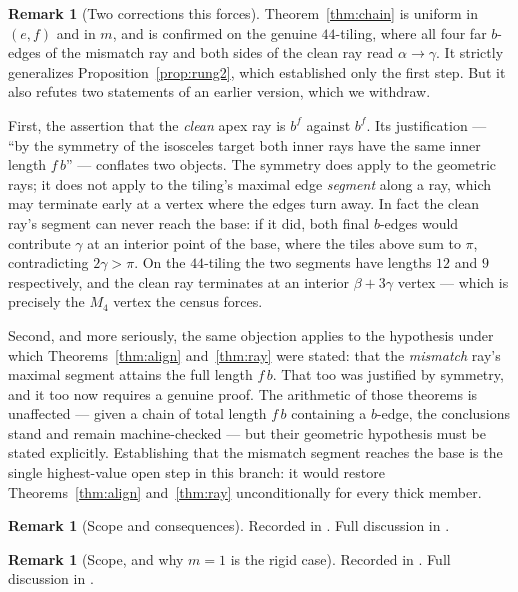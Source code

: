 \documentclass[11pt,reqno]{amsart}
\theoremstyle{plain}
\theoremstyle{definition}
\newtheorem{remark}[theorem]{Remark}
\begin{document}
\begin{remark}[Two corrections this forces]\label{rem:cleanfail}
Theorem~\ref{thm:chain} is uniform in $(e,f)$ and in $m$, and is confirmed on the genuine
$44$-tiling, where all four far $b$-edges of the mismatch ray and both sides of the clean ray read
$\alpha\to\gamma$. It strictly generalizes Proposition~\ref{prop:rung2}, which established only the
first step. But it also refutes two statements of an earlier version, which we withdraw.

First, the assertion that the \emph{clean} apex ray is $b^{f}$ against $b^{f}$. Its justification ---
``by the symmetry of the isosceles target both inner rays have the same inner length $f\,b$'' ---
conflates two objects. The symmetry does apply to the geometric rays; it does not apply to the
tiling's maximal edge \emph{segment} along a ray, which may terminate early at a vertex where the
edges turn away. In fact the clean ray's segment can never reach the base: if it did, both final
$b$-edges would contribute $\gamma$ at an interior point of the base, where the tiles above sum to
$\pi$, contradicting $2\gamma>\pi$. On the $44$-tiling the two segments have lengths $12$ and $9$
respectively, and the clean ray terminates at an interior $\beta+3\gamma$ vertex --- which is
precisely the $M_4$ vertex the census forces.

Second, and more seriously, the same objection applies to the hypothesis under which
Theorems~\ref{thm:align} and~\ref{thm:ray} were stated: that the \emph{mismatch} ray's maximal
segment attains the full length $f\,b$. That too was justified by symmetry, and it too now requires a
genuine proof. The arithmetic of those theorems is unaffected --- given a chain of total length
$f\,b$ containing a $b$-edge, the conclusions stand and remain machine-checked --- but their
geometric hypothesis must be stated explicitly. Establishing that the mismatch segment reaches the
base is the single highest-value open step in this branch: it would restore Theorems~\ref{thm:align}
and~\ref{thm:ray} unconditionally for every thick member.
\end{remark}

\begin{remark}[Scope and consequences]\label{rem:ray}
Recorded in \cite{Obstructions}. Full discussion in \cite{Obstructions}.
\end{remark}

\begin{remark}[Scope, and why $m=1$ is the rigid case]\label{rem:walkscope}
Recorded in \cite{Obstructions}. Full discussion in \cite{Obstructions}.
\end{remark}
\end{document}
